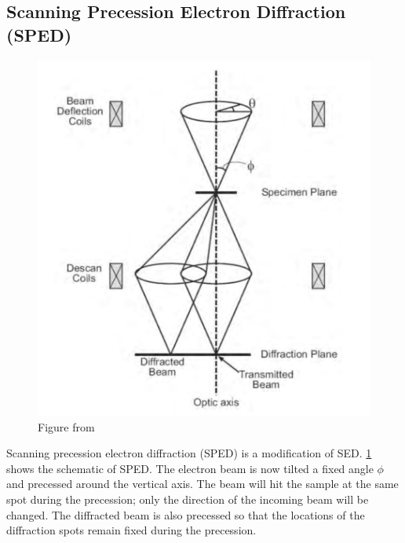 	\subsection{Scanning Precession Electron Diffraction (SPED)}

\begin{figure}
	\centering
	\includegraphics[width=0.7\linewidth]{fig/other/SPED-apparatus}
	\caption{Figure from \cite{sped-thesis}}
	\label{fig:precession}
\end{figure}

Scanning precession electron diffraction (SPED) is a modification of SED. \cref{fig:precession} shows the schematic of SPED. The electron beam is now tilted a fixed angle $\phi$ and precessed around the vertical axis. The beam will hit the sample at the same spot during the precession; only the direction of the incoming beam will be changed. The diffracted beam is also precessed so that the locations of the diffraction spots remain fixed during the precession. 

